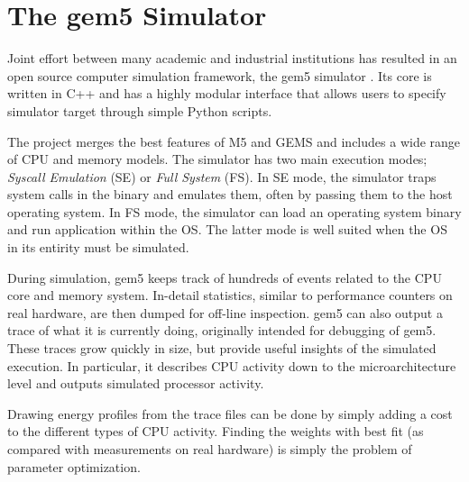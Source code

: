 \section{The gem5 Simulator}

Joint effort between many academic and industrial institutions has resulted in
an open source computer simulation framework, the gem5 simulator \cite{gem5}.
Its core is written in C++ and has a highly modular interface that allows users
to specify simulator target through simple Python scripts.

The project merges the best features of M5 \cite{M5} and GEMS \cite{GEMS} and
includes a wide range of CPU and memory models. The simulator has two main
execution modes; \textit{Syscall Emulation} (SE) or \textit{Full System} (FS).
In SE mode, the simulator traps system calls in the binary and emulates them,
often by passing them to the host operating system. In FS mode, the simulator
can load an operating system binary and run application within the OS. The
latter mode is well suited when the OS in its entirity must be simulated.


During simulation, gem5 keeps track of hundreds of events related to the CPU
core and memory system. In-detail statistics, similar to performance counters on
real hardware, are then dumped for off-line inspection. gem5 can also output a
trace of what it is currently doing, originally intended for debugging of gem5.
These traces grow quickly in size, but provide useful insights of the simulated
execution. In particular, it describes CPU activity down to the
microarchitecture level and outputs simulated processor activity.

Drawing energy profiles from the trace files can be done by simply adding a cost
to the different types of CPU activity. Finding the weights with best fit
(as compared with measurements on real hardware) is simply the problem of
parameter optimization.
